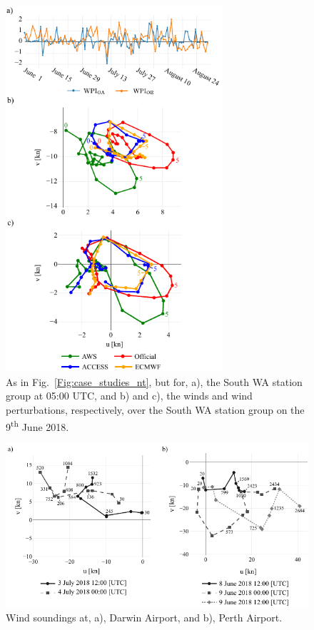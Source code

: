 \documentclass[twocol]{ametsoc}
\begin{document}
\begin{figure}
\centering
\includegraphics[width=19pc]{case_studies_wa.pdf}
\caption{As in Fig.~\ref{Fig:case_studies_nt}, but for, a), the South WA station group at 05:00 UTC, and b) and c), the winds and wind perturbations, respectively, over the South WA station group on the 9\textsuperscript{th} June 2018.} 
\label{Fig:case_studies_wa}
\end{figure}

\begin{figure}
\centering
\includegraphics[width=33pc]{perth_sounding.pdf}
\caption{Wind soundings at, a), Darwin Airport, and b), Perth Airport.}
\label{Fig:perth_sounding}
\end{figure}
\end{document}
